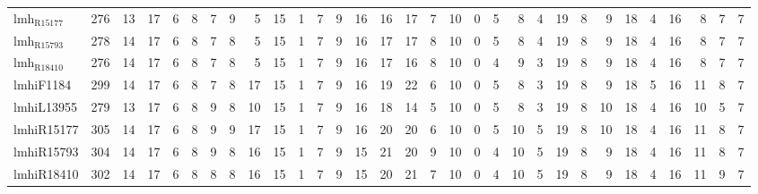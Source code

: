 \begin{center}
\begin{tabular}{lrrrrrrrrrrrrrrrrrrrrrrrrrrrrrr}
lmh$_{\text{R15177}}$ & 276 & 13 & 17 & 6 & 8 & 7 & 9 & 5 & 15 & 1 & 7 & 9 & 16 & 16 & 17 & 7 & 10 & 0 & 5 & 8 & 4 & 19 & 8 & 9 & 18 & 4 & 16 & 8 & 7 & 7\\
lmh$_{\text{R15793}}$ & 278 & 14 & 17 & 6 & 8 & 7 & 8 & 5 & 15 & 1 & 7 & 9 & 16 & 17 & 17 & 8 & 10 & 0 & 5 & 8 & 4 & 19 & 8 & 9 & 18 & 4 & 16 & 8 & 7 & 7\\
lmh$_{\text{R18410}}$ & 276 & 14 & 17 & 6 & 8 & 7 & 8 & 5 & 15 & 1 & 7 & 9 & 16 & 17 & 16 & 8 & 10 & 0 & 4 & 9 & 3 & 19 & 8 & 9 & 18 & 4 & 16 & 8 & 7 & 7\\
lmhiF1184 & 299 & 14 & 17 & 6 & 8 & 7 & 8 & 17 & 15 & 1 & 7 & 9 & 16 & 19 & 22 & 6 & 10 & 0 & 5 & 8 & 3 & 19 & 8 & 9 & 18 & 5 & 16 & 11 & 8 & 7\\
lmhiL13955 & 279 & 13 & 17 & 6 & 8 & 9 & 8 & 10 & 15 & 1 & 7 & 9 & 16 & 18 & 14 & 5 & 10 & 0 & 5 & 8 & 3 & 19 & 8 & 10 & 18 & 4 & 16 & 10 & 5 & 7\\
lmhiR15177 & 305 & 14 & 17 & 6 & 8 & 9 & 9 & 17 & 15 & 1 & 7 & 9 & 16 & 20 & 20 & 6 & 10 & 0 & 5 & 10 & 5 & 19 & 8 & 10 & 18 & 4 & 16 & 11 & 8 & 7\\
lmhiR15793 & 304 & 14 & 17 & 6 & 8 & 9 & 8 & 16 & 15 & 1 & 7 & 9 & 15 & 21 & 20 & 9 & 10 & 0 & 4 & 10 & 5 & 19 & 8 & 9 & 18 & 4 & 16 & 11 & 8 & 7\\
lmhiR18410 & 302 & 14 & 17 & 6 & 8 & 8 & 8 & 16 & 15 & 1 & 7 & 9 & 15 & 20 & 21 & 7 & 10 & 0 & 4 & 10 & 5 & 19 & 8 & 9 & 18 & 4 & 16 & 11 & 9 & 7\\
\end{tabular}
\end{center}
